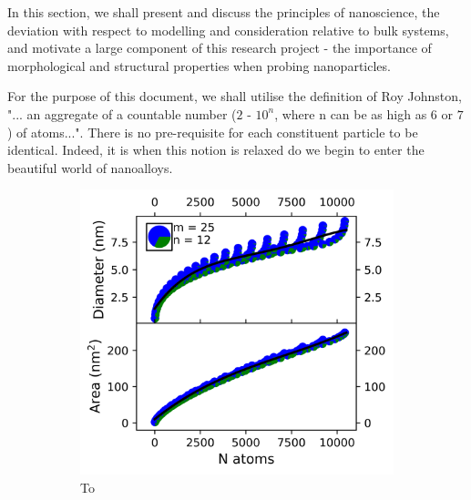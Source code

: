 In this section, we shall present and discuss the principles of nanoscience, the deviation with respect to modelling and consideration relative to bulk systems, and motivate a large component of this research project - the importance of morphological and structural properties when probing nanoparticles.

For the purpose of this document, we shall utilise the definition of Roy Johnston, "... an aggregate of a countable number ($2$ - $10^n$, where n can be as high as $6$ or $7$) of atoms...". There is no pre-requisite for each constituent particle to be identical. Indeed, it is when this notion is relaxed do we begin to enter the beautiful world of nanoalloys.


\begin{figure}
\centering
\begin{subfigure}[b]{0.425\textwidth}
    \includegraphics[width=\textwidth]{figures/Theory/To_Size_lin.png}
    \caption{To} 
    \label{Fig:Nps_To}
\end{subfigure}
\begin{subfigure}[b]{0.425\textwidth}

\end{subfigure}
\end{figure}
